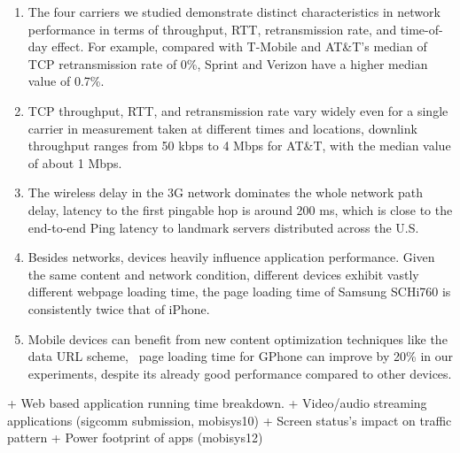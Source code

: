\begin{enumerate}%

\item The four carriers we studied demonstrate distinct 
characteristics in network performance in terms of throughput, RTT, 
retransmission rate, and time-of-day effect. For example, compared 
with T-Mobile and AT\&T's median of TCP retransmission rate of 
0\%, Sprint and Verizon have a higher median value of 0.7\%. 

\item TCP throughput, RTT, and retransmission rate vary widely even
for a single carrier in measurement taken at different times and 
locations, \eg downlink throughput ranges from 50 kbps to 4 Mbps for 
AT\&T, with the median value of about 1 Mbps.

\item The wireless delay in the 3G network dominates the whole
network path delay, \eg latency to the first pingable hop is around 
200 ms, which is close to the end-to-end Ping latency to landmark
servers distributed across the U.S.

\item Besides networks, devices heavily influence application 
performance. Given the same content and network condition, different 
devices exhibit vastly different webpage loading time, \eg the
page loading time of Samsung SCHi760 is consistently twice that of 
iPhone. 

\item Mobile devices can benefit from new content optimization
techniques like the data URL scheme, \eg~page loading time for 
GPhone can improve by 20\% in our experiments, despite 
its already good performance compared to other devices.
\end{enumerate}



	
	
	
	
	+ Web based application running time breakdown.
	+ Video/audio streaming applications (sigcomm submission, mobisys10)
	+ Screen status's impact on traffic pattern
	+ Power footprint of apps (mobisys12)
